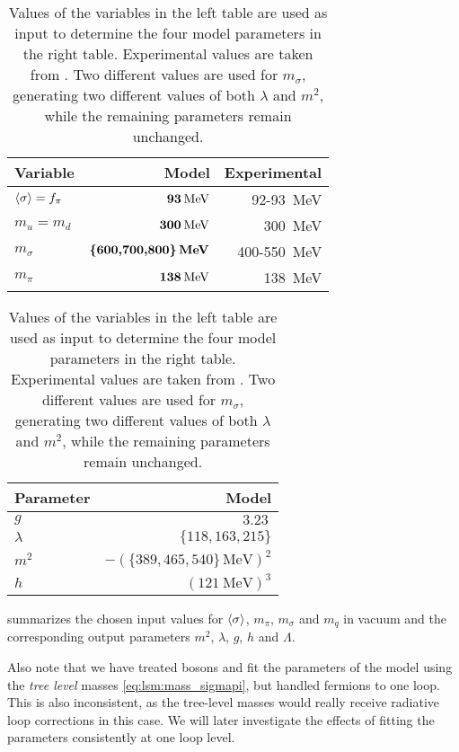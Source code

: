 \begin{table}[t]
\centering
\begin{tabular}{ l r r }
	\toprule
	Variable & Model                                   & Experimental       \\
	\midrule
	$\langle \sigma \rangle=f_\pi$ & $\textbf{\SI{93}{\mega\electronvolt}}$  & \SI{92}{}-\SI{93}{\mega\electronvolt} \\
	$m_u=m_d$            & $\textbf{\SI{300}{\mega\electronvolt}}$ & \approx \, \SI{300}{\mega\electronvolt} \\
	$m_\sigma$           & $\textbf{\{600,700,800\}\,\si{\mega\electronvolt}}$ & \SI{400}{}-\SI{550}{\mega\electronvolt}          \\
	$m_\pi$              & $\textbf{\SI{138}{\mega\electronvolt}}$ & \SI{138}{\mega\electronvolt}                     \\
	\bottomrule
\end{tabular}
\hfill
\begin{tabular}{ l r }
	\toprule
	Parameter   & Model                                 \\
	\midrule
	$g$         & $\SI{3.23}{}$                         \\
	$\lambda$   & $\{118,163,215\}$                        \\
	$m^2$       & $-(\{389,465,540\} \, \si{\mega\electronvolt})^2$ \\
	$h$         & $(\SI{121}{\mega\electronvolt})^3$  \\
	\bottomrule
\end{tabular}
\caption{\label{tab:lsm2f:parameters}%
Values of the variables in the left table are used as input to determine the four model parameters in the right table.
Experimental values are taken from \cite{ref:pdg_review_2021}.
Two different values are used for $m_\sigma$, generating two different values of both $\lambda$ and $m^2$, while the remaining parameters remain unchanged.
}
\end{table}

 summarizes the chosen input values for $\langle \sigma \rangle$, $m_\pi$, $m_\sigma$ and $m_q$ in vacuum and the corresponding output parameters $m^2$, $\lambda$, $g$, $h$ and $\Lambda$.

Also note that we have treated bosons and fit the parameters of the model using the \emph{tree level} masses \eqref{eq:lsm:mass_sigmapi},
but handled fermions to one loop. 
This is also inconsistent, as the tree-level masses would really receive radiative loop corrections in this case.
We will later investigate the effects of fitting the parameters consistently at one loop level.

